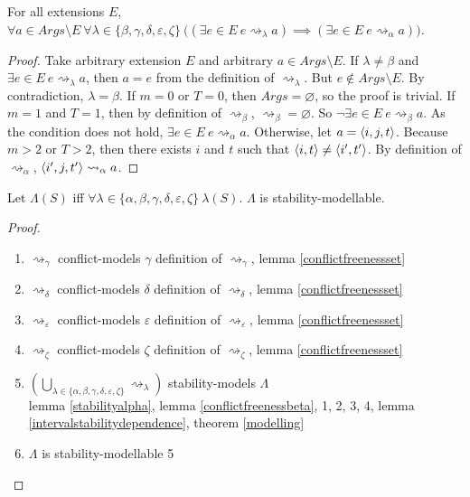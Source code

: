 \begin{lemma}
	\label{intervalstabilitydependence}
	For all extensions $E$, $\forall a\in Args\setminus E\ \forall\lambda\in\{\beta,\gamma,\delta,\varepsilon,\zeta\}\ \big((\exists e\in E\ e\rightsquigarrow_\lambda a)\implies(\exists e\in E\ e\rightsquigarrow_\alpha a)\big)$.
	
	\begin{proof}
		Take arbitrary extension $E$ and arbitrary $a\in Args\setminus E$. If $\lambda\neq\beta$ and $\exists e\in E\ e\rightsquigarrow_\lambda a$, then $a=e$ from the definition of $\rightsquigarrow_\lambda$. But $e\not\in Args\setminus E$. By contradiction, $\lambda=\beta$.
		\linespace
		If $m=0$ or $T=0$, then $Args=\varnothing$, so the proof is trivial.
		\linespace
		If $m=1$ and $T=1$, then by definition of $\rightsquigarrow_\beta$, $\rightsquigarrow_\beta=\varnothing$. So $\neg\exists e\in E\ e\rightsquigarrow_\beta a$. As the condition does not hold, $\exists e\in E\ e\rightsquigarrow_\alpha a$.
		\linespace
		Otherwise, let $a=\langle{i},{j},{t}\rangle$. Because $m>2$ or $T>2$, then there exists $i$ and $t$ such that $\langle{i},{t}\rangle\neq\langle{i'},{t'}\rangle$. By definition of $\rightsquigarrow_\alpha$, $\langle{i'},{j},{t'}\rangle\rightsquigarrow_\alpha a$.
	\end{proof}
\end{lemma}

\begin{theorem}
	Let $\Lambda(S)$ iff $\forall\lambda\in\{\alpha,\beta,\gamma,\delta,\varepsilon,\zeta\}\ \lambda(S)$. $\Lambda$ is stability-modellable.
	
	\begin{proof}\ 
		\begin{enumerate}
			\item $\rightsquigarrow_\gamma$ conflict-models $\gamma$ \hfill definition of $\rightsquigarrow_\gamma$, lemma \ref{conflictfreenessset}
			\item $\rightsquigarrow_\delta$ conflict-models $\delta$ \hfill definition of $\rightsquigarrow_\delta$, lemma \ref{conflictfreenessset}
			\item $\rightsquigarrow_\varepsilon$ conflict-models $\varepsilon$ \hfill definition of $\rightsquigarrow_\varepsilon$, lemma \ref{conflictfreenessset}
			\item $\rightsquigarrow_\zeta$ conflict-models $\zeta$ \hfill definition of $\rightsquigarrow_\zeta$, lemma \ref{conflictfreenessset}
			\item $\left(\bigcup_{\lambda\in\{\alpha,\beta,\gamma,\delta,\varepsilon,\zeta\}}\rightsquigarrow_\lambda\right)$ stability-models $\Lambda$\\\indent\hfill lemma \ref{stabilityalpha}, lemma \ref{conflictfreenessbeta}, 1, 2, 3, 4, lemma \ref{intervalstabilitydependence}, theorem \ref{modelling}
			\item $\Lambda$ is stability-modellable \hfill 5
		\end{enumerate}
	\end{proof}
\end{theorem}